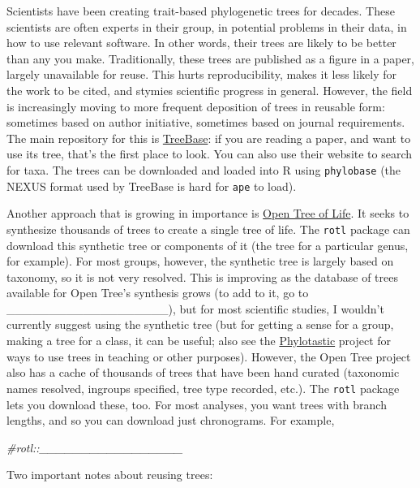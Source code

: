 \documentclass[]{book}
\newenvironment{Shaded}{\begin{snugshade}}{\end{snugshade}}
\newcommand{\CommentTok}[1]{\textcolor[rgb]{0.56,0.35,0.01}{\textit{{#1}}}}
\theoremstyle{definition}
\theoremstyle{definition}
\theoremstyle{remark}
\begin{document}
Scientists have been creating trait-based phylogenetic trees for
decades. These scientists are often experts in their group, in potential
problems in their data, in how to use relevant software. In other words,
their trees are likely to be better than any you make. Traditionally,
these trees are published as a figure in a paper, largely unavailable
for reuse. This hurts reproducibility, makes it less likely for the work
to be cited, and stymies scientific progress in general. However, the
field is increasingly moving to more frequent deposition of trees in
reusable form: sometimes based on author initiative, sometimes based on
journal requirements. The main repository for this is
\href{http://treebase.org}{TreeBase}: if you are reading a paper, and
want to use its tree, that's the first place to look. You can also use
their website to search for taxa. The trees can be downloaded and loaded
into R using \texttt{phylobase} (the NEXUS format used by TreeBase is
hard for \texttt{ape} to load).

Another approach that is growing in importance is
\href{http://otol.org}{Open Tree of Life}. It seeks to synthesize
thousands of trees to create a single tree of life. The \texttt{rotl}
package can download this synthetic tree or components of it (the tree
for a particular genus, for example). For most groups, however, the
synthetic tree is largely based on taxonomy, so it is not very resolved.
This is improving as the database of trees available for Open Tree's
synthesis grows (to add to it, go to
\_\_\_\_\_\_\_\_\_\_\_\_\_\_\_\_\_\_\_), but for most scientific
studies, I wouldn't currently suggest using the synthetic tree (but for
getting a sense for a group, making a tree for a class, it can be
useful; also see the \href{http://www.phylotastic.org}{Phylotastic}
project for ways to use trees in teaching or other purposes). However,
the Open Tree project also has a cache of thousands of trees that have
been hand curated (taxonomic names resolved, ingroups specified, tree
type recorded, etc.). The \texttt{rotl} package lets you download these,
too. For most analyses, you want trees with branch lengths, and so you
can download just chronograms. For example,

\begin{Shaded}
\begin{Highlighting}[]
\CommentTok{#rotl::_________________}
\end{Highlighting}
\end{Shaded}

Two important notes about reusing trees:
\end{document}

